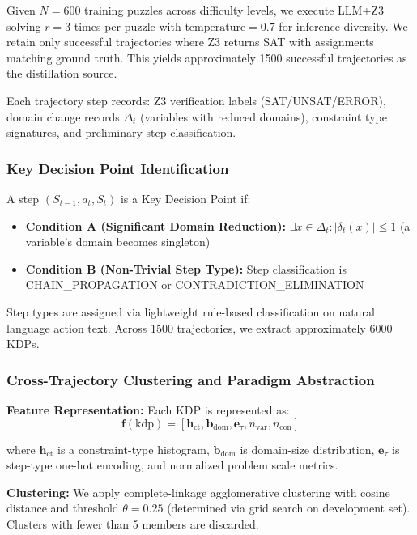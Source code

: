 \documentclass[letterpaper]{article}
\begin{document}
Given $N = 600$ training puzzles across difficulty levels, we execute LLM+Z3 solving $r = 3$ times per puzzle with $\text{temperature} = 0.7$ for inference diversity. We retain only successful trajectories where Z3 returns SAT with assignments matching ground truth. This yields approximately 1500 successful trajectories as the distillation source.

Each trajectory step records: Z3 verification labels (SAT/UNSAT/ERROR), domain change records $\Delta_t$ (variables with reduced domains), constraint type signatures, and preliminary step classification.

\subsubsection{Key Decision Point Identification}

A step $(S_{t-1}, a_t, S_t)$ is a Key Decision Point if:
\begin{itemize}
    \item \textbf{Condition A (Significant Domain Reduction):} $\exists x \in \Delta_t: |\delta_t(x)| \leq 1$ (a variable's domain becomes singleton)
    \item \textbf{Condition B (Non-Trivial Step Type):} Step classification is CHAIN\_PROPAGATION or CONTRADICTION\_ELIMINATION
\end{itemize}

Step types are assigned via lightweight rule-based classification on natural language action text. Across 1500 trajectories, we extract approximately 6000 KDPs.

\subsubsection{Cross-Trajectory Clustering and Paradigm Abstraction}

\textbf{Feature Representation:} Each KDP is represented as:
$$\mathbf{f}(\text{kdp}) = [\mathbf{h}_{\text{ct}}, \mathbf{b}_{\text{dom}}, \mathbf{e}_\tau, n_{\text{var}}, n_{\text{con}}]$$

where $\mathbf{h}_{\text{ct}}$ is a constraint-type histogram, $\mathbf{b}_{\text{dom}}$ is domain-size distribution, $\mathbf{e}_\tau$ is step-type one-hot encoding, and normalized problem scale metrics.

\textbf{Clustering:} We apply complete-linkage agglomerative clustering with cosine distance and threshold $\theta = 0.25$ (determined via grid search on development set). Clusters with fewer than 5 members are discarded.
\end{document}
